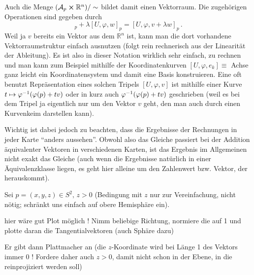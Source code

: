 \documentclass[../H_Analysis_main.tex]{subfiles}
\begin{document}

Auch die Menge $\qty(\mathcal{A}_p \cross \mathbb{R}^n)/ \sim$ bildet damit einen Vektorraum. Die zugehörigen Operationen sind gegeben durch
\begin{equation}
[U, \varphi, v]_p + \lambda [U, \varphi, w]_p = [U, \varphi, v + \lambda w]_p \, .
\end{equation}
Weil ja $v$ bereits ein Vektor aus dem $\mathbb{R}^n$ ist, kann man die dort vorhandene Vektorraumstruktur einfach ausnutzen (folgt rein rechnerisch aus der Linearität der Ableitung). Es ist also in dieser Notation wirklich sehr einfach, zu rechnen und man kann zum Beispiel mithilfe der Koordinatenkurven $[U, \varphi, e_k] \equiv$ Achse ganz leicht ein Koordinatensystem und damit eine Basis konstruieren. Eine oft benutzt Repräsentation eines solchen Tripels $[U, \varphi, v]$ ist mithilfe einer Kurve $t \mapsto \varphi^{-1}\qty(\varphi(p) + t v)$ oder in kurz auch $\varphi^{-1}\qty(\varphi(p) + t v)$ geschrieben (weil es bei dem Tripel ja eigentlich nur um den Vektor $v$ geht, den man auch durch einen Kurvenkeim darstellen kann).

Wichtig ist dabei jedoch zu beachten, dass die Ergebnisse der Rechnungen in jeder Karte \enquote{anders aussehen}. Obwohl also das Gleiche passiert bei der Addition äquivalenter Vektoren in verschiedenen Karten, ist das Ergebnis im Allgemeinen nicht exakt das Gleiche (auch wenn die Ergebnisse natürlich in einer Äquivalenzklasse liegen, es geht hier alleine um den Zahlenwert bzw. Vektor, der herauskommt).


\begin{bsp}[Sphäre]
Sei $p = (x, y, z) \in S^2, \, z > 0$ (Bedingung mit $z$ nur zur Vereinfachung, nicht nötig; schränkt uns einfach auf obere Hemisphäre ein).

hier wäre gut Plot möglich ! Nimm beliebige Richtung, normiere die auf 1 und plotte daran die Tangentialvektoren (auch Sphäre dazu)
 
Er gibt dann Plattmacher an (die $z$-Koordinate wird bei Länge 1 des Vektors immer 0 ! Fordere daher auch $z > 0$, damit nicht schon in der Ebene, in die reinprojiziert werden soll)
\end{bsp}
\end{document}
